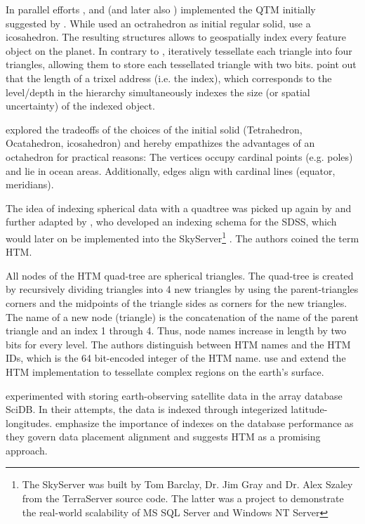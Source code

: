 \documentclass[a4paper,10pt]{article}
\begin{document}
In parallel efforts \cite{Fekete1990, Fekete1990a}, and \cite{Goodchild1992} (and later also \cite{Lugo1995}) implemented the \gls{QTM} initially suggested by \cite{Dutton1984}. While \cite{Goodchild1992} used an octrahedron as initial regular solid, \cite{Fekete1990, Fekete1990a} use a icosahedron.
The resulting structures allows to geospatially index every feature object on the planet. 
In contrary to \cite{Dutton1984}, \cite{Fekete1990, Fekete1990a, Goodchild1992, Lugo1995} iteratively tessellate each triangle into four triangles, allowing them to store each tessellated triangle with two bits.
\cite{Goodchild1992} point out that the length of a trixel address (i.e. the index), which corresponds to the level/depth in the hierarchy simultaneously indexes the size (or spatial uncertainty) of the indexed object.

\cite{Dutton1996} explored the tradeoffs of the choices of the initial solid (Tetrahedron, Ocatahedron, icosahedron) and hereby empathizes the advantages of an octahedron for practical reasons: The vertices occupy cardinal points (e.g. poles) and lie in ocean areas. Additionally, edges align with cardinal lines (equator, meridians).

The idea of indexing spherical data with a quadtree was picked up again by \cite{Barret1995} and further adapted by \cite{Kunszt2000, Kunszt2001, Szalay2005}, who developed an indexing schema for the \gls{SDSS}, which would later on be implemented into the SkyServer\footnote{The SkyServer was built by Tom Barclay, Dr. Jim Gray and Dr. Alex Szaley from the TerraServer \citep{Barclay1998, Slutz1999} source code. The latter was a project to demonstrate the real-world scalability of MS SQL Server and Windows NT Server} \citep{Szalay2002, Thakar2003}.
The authors coined the term \gls{HTM}.

All nodes of the \gls{HTM} quad-tree are spherical triangles. The quad-tree is created by recursively dividing triangles into 4 new triangles by using the parent-triangles corners and the midpoints of the triangle sides as corners for the new triangles.
The name of a new node (triangle) is the concatenation of the name of the parent triangle and an index 1 through 4. Thus, node names increase in length by two bits for every level. The authors distinguish between \gls{HTM} names and the \gls{HTM} IDs, which is the 64 bit-encoded integer of the \gls{HTM} name. 
\cite{Kondor2014} use and extend the \gls{HTM} implementation to tessellate complex regions on the earth's surface.

\cite{Planthaber2012, Planthaber2012b, Krcal2015, Hausen2016, Doan2016} experimented with storing earth-observing satellite data in the array database SciDB. In their attempts, the data is indexed through integerized latitude-longitudes. \cite{Doan2016} emphasize the importance of indexes on the database performance as they govern data placement alignment and suggests \gls{HTM} as a promising approach.
\end{document}
